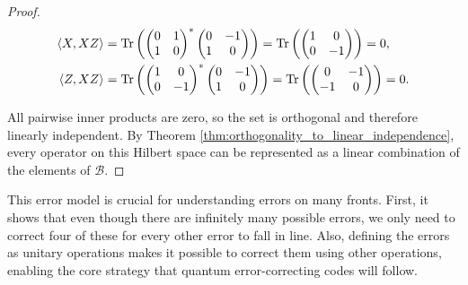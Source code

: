 \begin{theorem}
\begin{proof}
\begin{align*}
\left\langle X, XZ \right\rangle &= \operatorname{Tr}\left( \begin{pmatrix}0 & 1 \\1 & 0\end{pmatrix}^* \begin{pmatrix}0 & -1 \\1 & 0\end{pmatrix} \right) = \operatorname{Tr}\left(\begin{pmatrix}1 & 0 \\0 & -1\end{pmatrix}\right) = 0, \\
\left\langle Z, XZ \right\rangle &= \operatorname{Tr}\left( \begin{pmatrix}1 & 0 \\0 & -1\end{pmatrix}^* \begin{pmatrix}0 & -1 \\1 & 0\end{pmatrix} \right) = \operatorname{Tr}\left(\begin{pmatrix}0 & -1 \\-1 & 0\end{pmatrix}\right) = 0
.\end{align*}

All pairwise inner products are zero, so the set is orthogonal and therefore linearly independent. By Theorem \ref{thm:orthogonality_to_linear_independence}, every operator on this Hilbert space can be represented as a linear combination of the elements of $\mathcal{B}$.
\end{proof}
\end{theorem}

This error model is crucial for understanding errors on many fronts. First, it shows that even though there are infinitely many possible errors, we only need to correct four of these for every other error to fall in line. Also, defining the errors as unitary operations makes it possible to correct them using other operations, enabling the core strategy that quantum error-correcting codes will follow.
